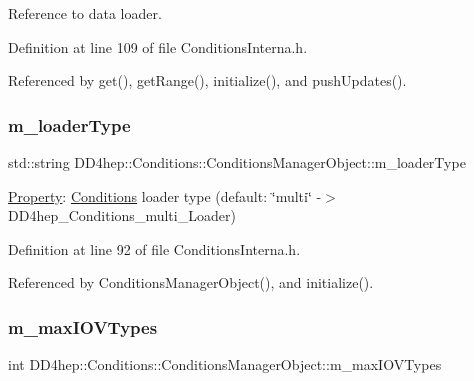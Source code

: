 Reference to data loader. 



Definition at line 109 of file Conditions\+Interna.\+h.



Referenced by get(), get\+Range(), initialize(), and push\+Updates().

\hypertarget{class_d_d4hep_1_1_conditions_1_1_conditions_manager_object_adc2a8ecbe9ee734901bdf11dc2e3da0e}{}\label{class_d_d4hep_1_1_conditions_1_1_conditions_manager_object_adc2a8ecbe9ee734901bdf11dc2e3da0e} 
\subsubsection{\texorpdfstring{m\+\_\+loader\+Type}{m\_loaderType}}
{\footnotesize\ttfamily std\+::string D\+D4hep\+::\+Conditions\+::\+Conditions\+Manager\+Object\+::m\+\_\+loader\+Type}



\hyperlink{class_d_d4hep_1_1_property}{Property}\+: \hyperlink{namespace_d_d4hep_1_1_conditions}{Conditions} loader type (default\+: \char`\"{}multi\char`\"{} -\/$>$ D\+D4hep\+\_\+\+Conditions\+\_\+multi\+\_\+\+Loader) 



Definition at line 92 of file Conditions\+Interna.\+h.



Referenced by Conditions\+Manager\+Object(), and initialize().

\hypertarget{class_d_d4hep_1_1_conditions_1_1_conditions_manager_object_a8367e7cb7b833dee436e0eacb6c37a87}{}\label{class_d_d4hep_1_1_conditions_1_1_conditions_manager_object_a8367e7cb7b833dee436e0eacb6c37a87} 
\subsubsection{\texorpdfstring{m\+\_\+max\+I\+O\+V\+Types}{m\_maxIOVTypes}}
{\footnotesize\ttfamily int D\+D4hep\+::\+Conditions\+::\+Conditions\+Manager\+Object\+::m\+\_\+max\+I\+O\+V\+Types}



